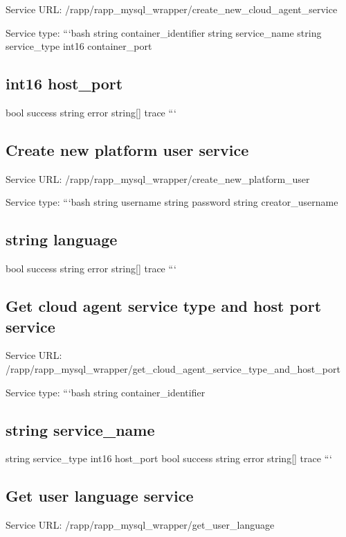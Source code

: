 Service U\-R\-L\-: {\ttfamily /rapp/rapp\-\_\-mysql\-\_\-wrapper/create\-\_\-new\-\_\-cloud\-\_\-agent\-\_\-service}

Service type\-: ```bash string container\-\_\-identifier string service\-\_\-name string service\-\_\-type int16 container\-\_\-port \subsection*{int16 host\-\_\-port }

bool success string error string\mbox{[}\mbox{]} trace ```

\subsection*{Create new platform user service}

Service U\-R\-L\-: {\ttfamily /rapp/rapp\-\_\-mysql\-\_\-wrapper/create\-\_\-new\-\_\-platform\-\_\-user}

Service type\-: ```bash string username string password string creator\-\_\-username \subsection*{string language }

bool success string error string\mbox{[}\mbox{]} trace ```

\subsection*{Get cloud agent service type and host port service}

Service U\-R\-L\-: {\ttfamily /rapp/rapp\-\_\-mysql\-\_\-wrapper/get\-\_\-cloud\-\_\-agent\-\_\-service\-\_\-type\-\_\-and\-\_\-host\-\_\-port}

Service type\-: ```bash string container\-\_\-identifier \subsection*{string service\-\_\-name }

string service\-\_\-type int16 host\-\_\-port bool success string error string\mbox{[}\mbox{]} trace ```

\subsection*{Get user language service}

Service U\-R\-L\-: {\ttfamily /rapp/rapp\-\_\-mysql\-\_\-wrapper/get\-\_\-user\-\_\-language}

